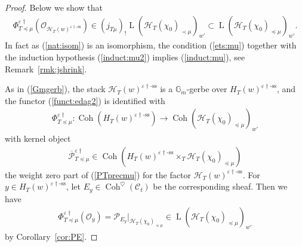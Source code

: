 \documentclass[11pt,oneside,a4paper,mathscr]{amsart}
\theoremstyle{definition}
\newcommand{\LL}{\operatorname{L}}
\newcommand{\cH}{\mathcal{H}}
\newcommand{\cC}{\mathcal{C}}
\newcommand{\cP}{\mathcal{P}}
\newcommand{\Coh}{\operatorname{Coh}}
\newcommand{\vd}{\varepsilon\dag}
\begin{document}
\begin{proof}
Below we show that 
\begin{align}\label{ets:mu}
     \Phi_{T\preceq \mu}^{\varepsilon\dag}(\mathcal{O}_{\cH_T(w)^{\varepsilon\dag\text{-ss}}})\in 
     (j_{T\mu})_{!}\LL(\cH_T(\chi_0)_{\prec \mu})_{w'}
     \subset \LL(\cH_T(\chi_0)_{\preceq \mu})_{w'}.
\end{align}
In fact as (\ref{nat:isom}) is an isomorphism, the condition (\ref{ets:mu}) together with 
the induction hypothesis (\ref{induct:mu2}) implies 
(\ref{induct:mu}), see Remark~\ref{rmk:jshrink}. 

As in (\ref{Gmgerb}), the stack $\cH_T(w)^{\varepsilon\dag\text{-ss}}$ is a $\mathbb{G}_m$-gerbe over 
$H_T(w)^{\varepsilon\dag\text{-ss}}$, and the functor (\ref{funct:edag2}) is identified with 
\begin{align}\label{funct:edag3}
   \Phi_{T\preceq \mu}^{\varepsilon\dag} \colon \Coh(H_T(w)^{\varepsilon\dag\text{-ss}}) \to 
   \Coh(\cH_T(\chi_0)_{\preceq \mu})_{w'}
\end{align}
with kernel object 
\begin{align*}
    \overline{\cP}_{T\preceq \mu}^{\vd} \in \Coh(H_T(w)^{\vd\text{-ss}}\times_T \cH_T(\chi_0)_{\preceq \mu})
\end{align*}
the weight zero part of (\ref{PTprecmu}) for the factor 
$\cH_T(w)^{\vd\text{-ss}}$.
For $y\in H_T(w)^{\varepsilon\dag\text{-ss}}$, let $E_y\in \Coh^{\heartsuit}(\cC_t)$ be the corresponding sheaf. 
Then we have 
\begin{align*}
     \Phi_{T\preceq \mu}^{\varepsilon\dag}(\mathcal{O}_y)=\mathcal{P}_{E_y}|_{\cH_T(\chi_0)_{\preceq \mu}} \in \LL(\cH_T(\chi_0)_{\preceq \mu})_{w'}
\end{align*}
by Corollary~\ref{cor:PE}.


\end{proof}
\end{document}
